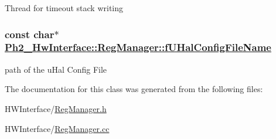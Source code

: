 Thread for timeout stack writing \hypertarget{class_ph2___hw_interface_1_1_reg_manager_aaa29ca65c283acc645132c7bef0f24f}{
\subsubsection[fUHalConfigFileName]{\setlength{\rightskip}{0pt plus 5cm}const char$\ast$ \hyperlink{class_ph2___hw_interface_1_1_reg_manager_aaa29ca65c283acc645132c7bef0f24f}{Ph2\_\-Hw\-Interface::Reg\-Manager::f\-UHal\-Config\-File\-Name}}}
\label{class_ph2___hw_interface_1_1_reg_manager_aaa29ca65c283acc645132c7bef0f24f}


path of the u\-Hal Config File 

The documentation for this class was generated from the following files:\begin{CompactItemize}
\item 
HWInterface/\hyperlink{_reg_manager_8h}{Reg\-Manager.h}\item 
HWInterface/\hyperlink{_reg_manager_8cc}{Reg\-Manager.cc}\end{CompactItemize}
